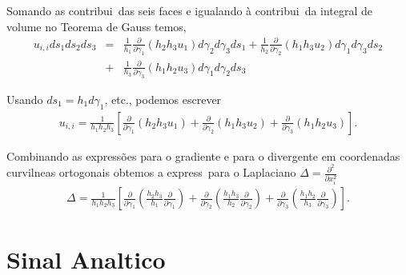 Somando as contribui\coes\ das seis faces e igualando \`a contribui\cao\ da integral de volume no Teorema de Gauss temos,
\begin{eqnarray*}
u_{i,i} ds_1 ds_2 ds_3 &=& \frac{1}{h_1}\frac{\partial}{\partial \gamma_1} (h_2 h_3 u_1) d\gamma_2 d\gamma_3 ds_1 
 + \frac{1}{h_{2}}\frac{\partial}{\partial \gamma_{2}}(h_{1}h_{3}u_{2})d\gamma_{1}d\gamma_{3}ds_{2} \\ 
&+&\frac{1}{h_{3}}\frac{\partial}{\partial \gamma_{3}}(h_{1}h_{2}u_{3})d\gamma_{1}d\gamma_{2}ds_{3}
\end{eqnarray*}

Usando $ds_{1} = h_{1}d\gamma_{1}$, etc., podemos escrever
\begin{eqnarray*}
u_{i,i}=\frac{1}{h_{1}h_{2}h_{3}}\left[\frac{\partial}{\partial\gamma_{1}}(h_{2}h_{3}u_{1}) 
       +\frac{\partial}{\partial \gamma_{2}}(h_{1}h_{3}u_{2})  
       +\frac{\partial}{\partial \gamma_{3}}(h_{1}h_{2}u_{3})\right].
\end{eqnarray*}

Combinando as express\~oes para o gradiente e para o divergente em coordenadas curvil\ih neas ortogonais obtemos a express\ao\ para o 
Laplaciano $\Delta = \frac{\partial^{2}}{\partial x_{i}^{2}}$
\begin{eqnarray}
\Delta = \frac{1}{h_1 h_2 h_3}\left[\frac{\partial}{\partial\gamma_1}\left(\frac{h_2 h_3}{h_1}\frac{\partial}{\partial\gamma_1}\right)
+\frac{\partial}{\partial\gamma_{2}}\left(\frac{h_{1}h_{3}}{h_{2}}\frac{\partial}{\partial\gamma_{2}}\right)+
 \frac{\partial}{\partial\gamma_{3}}\left(\frac{h_{1}h_{2}}{h_{3}}\frac{\partial}{\partial\gamma_{3}}\right)\right].
\end{eqnarray}

\section{Sinal Anal\ih tico}

